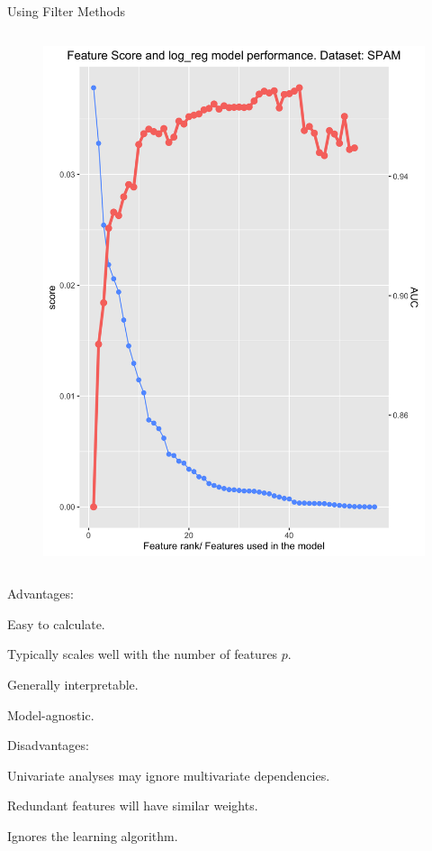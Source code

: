 \documentclass[11pt,compress,t,notes=noshow, xcolor=table]{beamer}
\begin{document}
\begin{vbframe}{Using Filter Methods}
\begin{columns}
    \begin{column}{0.5\textwidth}
      \vspace{0cm}
      \begin{figure}
        \centering
          \includegraphics[width=\textwidth]{figure/fs-filters-scree-plot.png} %
      \end{figure}
    \end{column}
  
  \end{columns}



  \framebreak

  \begin{blocki}{Advantages:}
  \setlength{\itemsep}{1.2em}
    \item Easy to calculate.
    \item Typically scales well with the number of features $p$.
    \item Generally interpretable.
    \item Model-agnostic.
  \end{blocki}

  \begin{blocki}{Disadvantages:}
  \setlength{\itemsep}{1.2em}
    \item Univariate analyses may ignore multivariate dependencies.
    \item Redundant features will have similar weights.
    \item Ignores the learning algorithm.
  \end{blocki}
  \end{vbframe}
\end{document}
